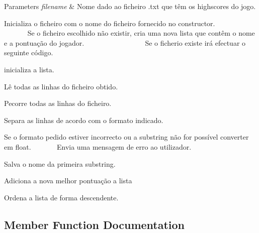 \begin{DoxyParams}{Parameters}
{\em filename} & Nome dado ao ficheiro .txt que têm os highscores do jogo.\\
\hline
\end{DoxyParams}
Inicializa o ficheiro com o nome do ficheiro fornecido no constructor. ~\newline
~\newline
~\newline
~\newline
~\newline
~\newline
~\newline
~\newline
~\newline
~\newline
~\newline
 Se o ficheiro escolhido não existir, cria uma nova lista que contêm o nome e a pontuação do jogador. ~\newline
~\newline
~\newline
~\newline
~\newline
~\newline
~\newline
~\newline
~\newline
~\newline
 Se o ficherio existe irá efectuar o seguinte código.

inicializa a lista.

Lê todas as linhas do ficheiro obtido.

Pecorre todas as linhas do ficheiro.

Separa as linhas de acordo com o formato indicado.

Se o formato pedido estiver incorrecto ou a substring não for possível converter em float. ~\newline
~\newline
~\newline
~\newline
 Envia uma mensagem de erro ao utilizador.

Salva o nome da primeira substring.

Adiciona a nova melhor pontuação a lista

Ordena a lista de forma descendente. 

\subsection{Member Function Documentation}
\mbox{\label{class_projeto2___l_p1_1_1_high_scores_manager_a51b97739e840ce7c0c15605d40e90072}} 

